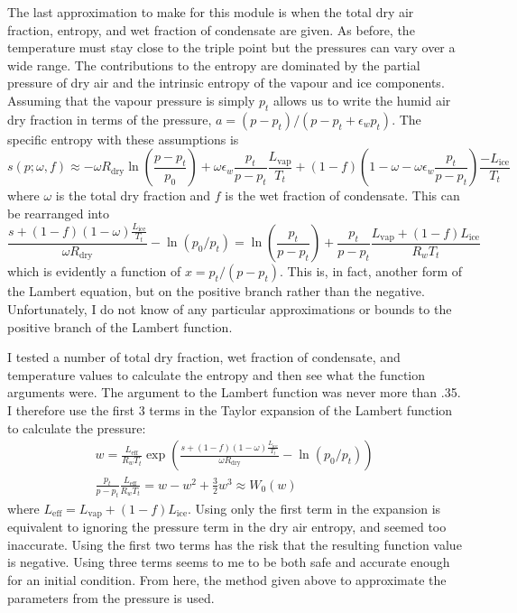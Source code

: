 \documentclass{article}
\newcommand{\vap}{\text{vap}}
\newcommand{\dry}{\text{dry}}
\newcommand{\ice}{\text{ice}}
\newcommand{\eff}{\text{eff}}
\newcommand{\epsw}{\epsilon_w}
\begin{document}
The last approximation to make for this module is when the total dry air fraction, entropy, and wet fraction of condensate are given. As before, the temperature must stay close to the triple point but the pressures can vary over a wide range. The contributions to the entropy are dominated by the partial pressure of dry air and the intrinsic entropy of the vapour and ice components. Assuming that the vapour pressure is simply $p_t$ allows us to write the humid air dry fraction in terms of the pressure, $a=(p-p_t)/(p-p_t + \epsw p_t)$. The specific entropy with these assumptions is
\begin{equation*}
    s(p;\omega,f) \approx -\omega R_{\dry} \ln\left( \frac{p-p_t}{p_0} \right) + \omega \epsw \frac{p_t}{p-p_t} \frac{L_{\vap}}{T_t} + (1-f) \left( 1-\omega - \omega \epsw \frac{p_t}{p-p_t} \right) \frac{-L_{\ice}}{T_t}
\end{equation*}
where $\omega$ is the total dry fraction and $f$ is the wet fraction of condensate. This can be rearranged into
\begin{equation*}
    \frac{s + (1-f)(1-\omega) \frac{L_{\ice}}{T_t}}{\omega R_{\dry}} - \ln(p_0/p_t) = \ln\left( \frac{p_t}{p-p_t} \right) + \frac{p_t}{p-p_t} \frac{L_{\vap} + (1-f) L_{\ice}}{R_w T_t}
\end{equation*}
which is evidently a function of $x = p_t/(p-p_t)$. This is, in fact, another form of the Lambert equation, but on the positive branch rather than the negative. Unfortunately, I do not know of any particular approximations or bounds to the positive branch of the Lambert function.

I tested a number of total dry fraction, wet fraction of condensate, and temperature values to calculate the entropy and then see what the function arguments were. The argument to the Lambert function was never more than .35. I therefore use the first 3 terms in the Taylor expansion of the Lambert function to calculate the pressure:
\begin{gather*}
    w = \frac{L_{\eff}}{R_w T_t} \exp\left( \frac{s + (1-f)(1-\omega) \frac{L_{\ice}}{T_t}}{\omega R_{\dry}} - \ln\left( p_0/p_t \right) \right) \\
    \frac{p_t}{p-p_t} \frac{L_{\eff}}{R_w T_t} = w - w^2 + \frac{3}{2} w^3 \approx W_0(w)
\end{gather*}
where $L_{\eff} = L_{\vap} + (1-f) L_{\ice}$. Using only the first term in the expansion is equivalent to ignoring the pressure term in the dry air entropy, and seemed too inaccurate. Using the first two terms has the risk that the resulting function value is negative. Using three terms seems to me to be both safe and accurate enough for an initial condition. From here, the method given above to approximate the parameters from the pressure is used.
\end{document}
